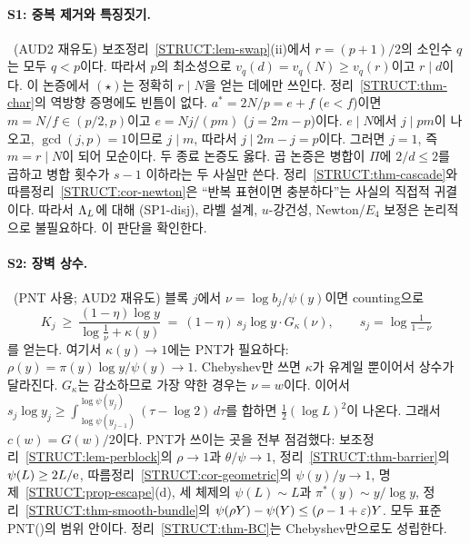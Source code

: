 \paragraph{S1: 중복 제거와 특징짓기.} \PROVED\ (AUD2 재유도)
보조정리~\ref{STRUCT:lem-swap}(ii)에서 $r=(p+1)/2$의 소인수 $q$는 모두 $q<p$이다. 따라서 $p$의 최소성으로 $v_q(d)=v_q(N)\ge v_q(r)$이고 $r\mid d$이다. 이 논증에서 $(\star)$는 정확히 $r\mid N$을 얻는 데에만 쓰인다.
정리~\ref{STRUCT:thm-char}의 역방향 증명에도 빈틈이 없다. $a^*=2N/p=e+f$ ($e<f$)이면 $m=N/f\in(p/2,p)$이고 $e=Nj/(pm)$ ($j=2m-p$)이다. $e\mid N$에서 $j\mid pm$이 나오고, $\gcd(j,p)=1$이므로 $j\mid m$, 따라서 $j\mid 2m-j=p$이다. 그러면 $j=1$, 즉 $m=r\mid N$이 되어 모순이다.
두 종료 논증도 옳다. 곱 논증은 병합이 $\Pi$에 $2/d\le2$를 곱하고 병합 횟수가 $s-1$ 이하라는 두 사실만 쓴다.
정리~\ref{STRUCT:thm-cascade}와 따름정리~\ref{STRUCT:cor-newton}은 ``반복 표현이면 충분하다''는 사실의 직접적 귀결이다. 따라서 $\Lambda_L$에 대해 (SP1-disj), 라벨 설계, $u$-강건성, Newton/$E_4$ 보정은 논리적으로 불필요하다. 이 판단을 확인한다.

\paragraph{S2: 장벽 상수.} \PROVED\ (PNT 사용; AUD2 재유도)
블록 $j$에서 $\nu=\log b_j/\psi(y)$이면 counting으로
\[
K_j\ \ge\ \frac{(1-\eta)\log y}{\log\frac1\nu+\kappa(y)}\ =\ (1-\eta)\,s_j\log y\cdot G_{\kappa}(\nu),\qquad s_j=\log\tfrac1{1-\nu}
\]
를 얻는다. 여기서 $\kappa(y)\to1$에는 PNT가 필요하다: $\rho(y)=\pi(y)\log y/\psi(y)\to1$. Chebyshev만 쓰면 $\kappa$가 유계일 뿐이어서 상수가 달라진다.
$G_\kappa$는 감소하므로 가장 약한 경우는 $\nu=w$이다. 이어서 $s_j\log y_j\ge\int_{\log\psi(y_{j-1})}^{\log\psi(y_j)}(\tau-\log2)\,d\tau$를 합하면 $\frac12(\log L)^2$이 나온다. 그래서 $c(w)=G(w)/2$이다.
PNT가 쓰이는 곳을 전부 점검했다: 보조정리~\ref{STRUCT:lem-perblock}의 $\rho\to1$과 $\theta/\psi\to1$, 정리~\ref{STRUCT:thm-barrier}의 $\psi(L)\ge2L/\mathrm{e}$, 따름정리~\ref{STRUCT:cor-geometric}의 $\psi(y)/y\to1$, 명제~\ref{STRUCT:prop-escape}(d), 세 체제의 $\psi(L)\sim L$과 $\pi^*(y)\sim y/\log y$, 정리~\ref{STRUCT:thm-smooth-bundle}의 $\psi(\rho Y)-\psi(Y)\le(\rho-1+\varepsilon)Y$. 모두 표준 PNT(\EXT)의 범위 안이다.
정리~\ref{STRUCT:thm-BC}는 Chebyshev만으로도 성립한다.

